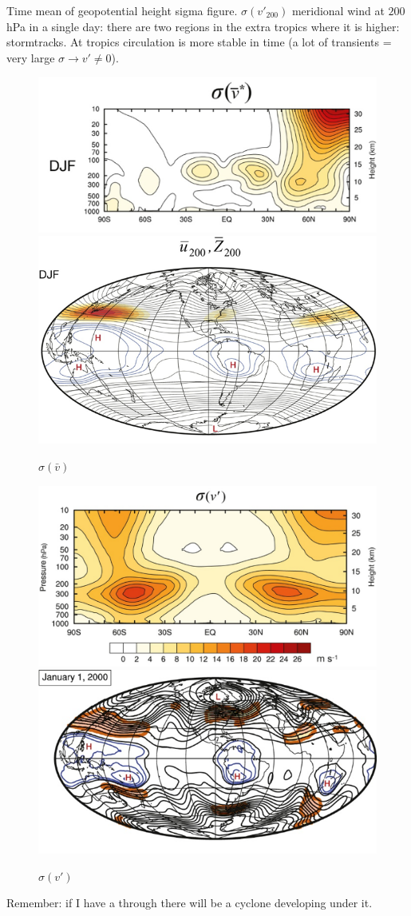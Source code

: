 Time mean of geopotential height sigma figure. $\sigma (v'_{200})$ meridional wind at $200$ hPa in a single day: there are two regions in the extra tropics where it is higher: stormtracks. At tropics circulation is more stable in time (a lot of transients = very large $\sigma\rightarrow v'\neq 0$). 

\begin{figure}
    \centering
    \includegraphics[width=0.5\linewidth]{uploads/sigma vmean.png}\includegraphics[width=0.5\linewidth]{uploads/sigma vmean world.png}
    \caption{$\sigma(\bar{v})$}
    \label{fig:sigma vmean}
\end{figure}
\begin{figure}[htpb]
    \centering
    \includegraphics[width=0.5\linewidth]{uploads/sigma vtrans.png}\includegraphics[width=0.5\linewidth]{uploads/sigma vtrans world.png}
    \caption{$\sigma(v')$}
    \label{fig:sigma vtrans}
\end{figure}

Remember: if I have a through there will be a cyclone developing under it.

